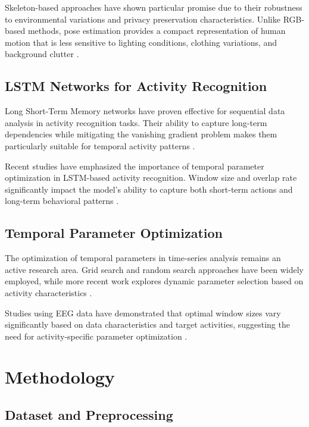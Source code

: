\documentclass[a4paper,11pt]{article}
\begin{document}
Skeleton-based approaches have shown particular promise due to their robustness to environmental variations and privacy preservation characteristics. Unlike RGB-based methods, pose estimation provides a compact representation of human motion that is less sensitive to lighting conditions, clothing variations, and background clutter \cite{yan2018spatial}.

\subsection{LSTM Networks for Activity Recognition}

Long Short-Term Memory networks have proven effective for sequential data analysis in activity recognition tasks. Their ability to capture long-term dependencies while mitigating the vanishing gradient problem makes them particularly suitable for temporal activity patterns \cite{hochreiter1997long}.

Recent studies have emphasized the importance of temporal parameter optimization in LSTM-based activity recognition. Window size and overlap rate significantly impact the model's ability to capture both short-term actions and long-term behavioral patterns \cite{martin2023time}.

\subsection{Temporal Parameter Optimization}

The optimization of temporal parameters in time-series analysis remains an active research area. Grid search and random search approaches have been widely employed, while more recent work explores dynamic parameter selection based on activity characteristics \cite{dong2020prediction}.

Studies using EEG data have demonstrated that optimal window sizes vary significantly based on data characteristics and target activities, suggesting the need for activity-specific parameter optimization \cite{martin2023time}.

\section{Methodology}

\subsection{Dataset and Preprocessing}
\end{document}
